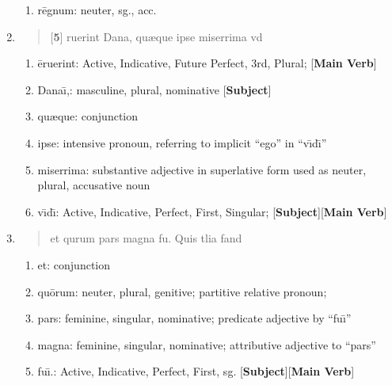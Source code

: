 \documentclass[]{article}
\newcommand{\latify}[1]{
        \Large
        \begin{verse}
          \begin{metrica}
          {#1}\\
          \end{metrica}
        \end{verse}
        \normalsize
}
\begin{document}
\begin{enumerate}
\begin{enumerate}
	\item r\={e}gnum:  neuter, sg., acc.

\end{enumerate}


\item \latify{[\textbf{5}] {}ruerint Dana{\macron {\i}}, qu{\ae}que ipse miserrima v{\macron {\i}}d{\macron {\i}}}
\begin{enumerate}

	\item \={e}ruerint:  Active, Indicative, Future Perfect, 3rd, Plural; [\textbf{Main Verb}]
                                                                    
	\item Dana\={\i},:  masculine, plural, nominative [\textbf{Subject}]

	\item qu{\ae}que: conjunction

	\item ipse:  intensive pronoun, referring to implicit ``ego'' in ``v\={\i}d\={\i}''

	\item miserrima:  substantive adjective in superlative form used as neuter, plural, accusative noun

	\item v\={\i}d\={\i}: Active, Indicative, Perfect, First, Singular;  [\textbf{Subject}][\textbf{Main Verb}]

\end{enumerate}

\item \latify{et qu{}rum pars magna fu{\macron {\i}}.  Quis t{\macron {a}}lia fand{\macron {o}}}
\begin{enumerate}

	\item et:  conjunction

	\item qu\={o}rum: neuter, plural, genitive; partitive relative pronoun; 

	\item pars:  feminine, singular, nominative; predicate adjective by ``fu\={\i}''

	\item magna: feminine, singular, nominative; attributive adjective to ``pars''

	\item fu\={\i}.: Active, Indicative, Perfect, First, sg.  [\textbf{Subject}][\textbf{Main Verb}]


\end{enumerate}
\end{enumerate}
\end{document}
